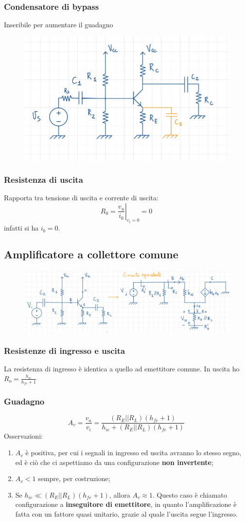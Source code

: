 \documentclass[11pt,a4paper,]{article}
\begin{document}
\subsubsection{Condensatore di bypass}
Inseribile per aumentare il guadagno
\begin{figure}[H]
    \centering
    \includegraphics[width=0.5\linewidth]{img/cond byp.png}
\end{figure}

\subsubsection{Resistenza di uscita}
Rapporta tra tensione di uscita e corrente di uscita:
\[
R_0=\left.\frac{v_u}{i_0}\right|_{v_i=0}=0
\]
infatti si ha $i_b=0$.
\subsection{Amplificatore a collettore comune}
\begin{figure}[H]   
    \centering
    \includegraphics[width=0.5\linewidth]{img/amp coll com.png}
\end{figure}
\subsubsection{Resistenze di ingresso e uscita}
La resistenza di ingresso è identica a quello ad emettitore comune.
In uscita ho $R_o = \frac{h_{ie}}{h_{fe}+1}$
\subsubsection{Guadagno}
\[
A_v = \frac{v_u}{v_i} = \frac{(R_E || R_L)(h_{fe} + 1)}{h_{ie} + (R_E || R_L)(h_{fe} + 1)}
\]
\noindent Osservazioni:
\begin{enumerate}
    \item $A_v$ è positiva, per cui i segnali in ingresso ed uscita avranno lo stesso segno, ed è ciò che ci aspettiamo da una configurazione \textbf{non invertente};
    \item $A_v < 1$ sempre, per costruzione;
    \item Se $h_{ie} \ll (R_E || R_L)(h_{fe} + 1)$, allora $A_v \approx 1$. Questo caso è chiamato configurazione a \textbf{inseguitore di emettitore}, in quanto l'amplificazione è fatta con un fattore quasi unitario, grazie al quale l'uscita segue l'ingresso.
\end{enumerate}
\end{document}
